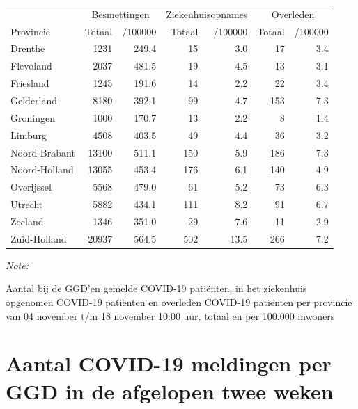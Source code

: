 \documentclass[
  english,
  man,floatsintext]{apa6}
\begin{document}
\begin{table}[H]
\centering
\begin{threeparttable}
\begin{tabular}{lrrrrrr}
\toprule
\multicolumn{1}{c}{ } & \multicolumn{2}{c}{Besmettingen} & \multicolumn{2}{c}{Ziekenhuisopnames} & \multicolumn{2}{c}{Overleden} \\
\cmidrule(l{3pt}r{3pt}){2-3} \cmidrule(l{3pt}r{3pt}){4-5} \cmidrule(l{3pt}r{3pt}){6-7}
Provincie & Totaal & /100000 & Totaal & /100000 & Totaal & /100000\\
\midrule
Drenthe & 1231 & 249.4 & 15 & 3.0 & 17 & 3.4\\
Flevoland & 2037 & 481.5 & 19 & 4.5 & 13 & 3.1\\
Friesland & 1245 & 191.6 & 14 & 2.2 & 22 & 3.4\\
Gelderland & 8180 & 392.1 & 99 & 4.7 & 153 & 7.3\\
Groningen & 1000 & 170.7 & 13 & 2.2 & 8 & 1.4\\
Limburg & 4508 & 403.5 & 49 & 4.4 & 36 & 3.2\\
Noord-Brabant & 13100 & 511.1 & 150 & 5.9 & 186 & 7.3\\
Noord-Holland & 13055 & 453.4 & 176 & 6.1 & 140 & 4.9\\
Overijssel & 5568 & 479.0 & 61 & 5.2 & 73 & 6.3\\
Utrecht & 5882 & 434.1 & 111 & 8.2 & 91 & 6.7\\
Zeeland & 1346 & 351.0 & 29 & 7.6 & 11 & 2.9\\
Zuid-Holland & 20937 & 564.5 & 502 & 13.5 & 266 & 7.2\\
\bottomrule
\end{tabular}
\begin{tablenotes}
\item \textit{Note: } 
\item Aantal bij de GGD’en gemelde COVID-19 patiënten, in het ziekenhuis opgenomen COVID-19 patiënten en overleden COVID-19 patiënten per provincie van 04 november t/m 18 november 10:00 uur, totaal en per 100.000 inwoners
\end{tablenotes}
\end{threeparttable}
\end{table}

\newpage

\hypertarget{aantal-covid-19-meldingen-per-ggd-in-de-afgelopen-twee-weken}{%
\section{Aantal COVID-19 meldingen per GGD in de afgelopen twee weken}\label{aantal-covid-19-meldingen-per-ggd-in-de-afgelopen-twee-weken}}
\end{document}

